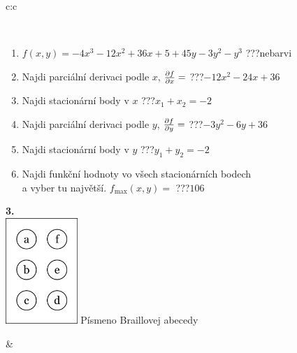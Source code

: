 \documentclass[10pt]{report}
\begin{document}
\begin{tabular}{c:c}
\begin{minipage}[c][104.5mm][t]{0.5\linewidth}
\begin{center}
\begin{minipage}{0.95\linewidth}
\begin{center}
\end{center}
\end{minipage}
\\[1mm]
\begin{minipage}{0.79\linewidth}
\begin{center}
\begin{varwidth}{\linewidth}
\begin{enumerate}
\normalsize
\item $f(x,y)=-4x^3-12x^2+36x+5+45y-3y^2-y^3$\quad \dotfill\; ???\;\dotfill \quad nebarvi
\item Najdi parciální derivaci podle $x$, $\pdv{f}{x}=$\quad \dotfill\; ???\;\dotfill \quad $-12x^2-24x+36$
\item Najdi stacionární body v $x$\quad \dotfill\; ???\;\dotfill \quad $x_1+x_2=-2$
\item Najdi parciální derivaci podle $y$, $\pdv{f}{y}=$\quad \dotfill\; ???\;\dotfill \quad $-3y^2-6y+36$
\item Najdi stacionární body v $y$\quad \dotfill\; ???\;\dotfill \quad $y_1+y_2=-2$
\item Najdi funkční hodnoty vo všech stacionárních bodech \\ \phantom{xxxxxx} a vyber tu najvětší. $f_{\text{max}}(x,y)=$\quad \dotfill\; ???\;\dotfill \quad $106$
\end{enumerate}
\end{varwidth}
\end{center}
\end{minipage}
\begin{minipage}{0.20\linewidth}
\begin{center}
{\Huge\bfseries 3.} \\[2mm]
\includegraphics[height=40mm]{../images/braille.png}
{\small Písmeno Braillovej abecedy}
\end{center}
\end{minipage}
\end{center}
\end{minipage}
&
\begin{minipage}[c][104.5mm][t]{0.5\linewidth}
\begin{center}

\end{center}
\end{minipage}
\end{tabular}
\end{document}
